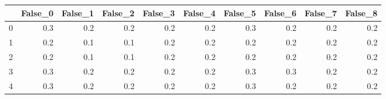 \begin{tabular}{lrrrrrrrrr}
\toprule
{} &  False\_0 &  False\_1 &  False\_2 &  False\_3 &  False\_4 &  False\_5 &  False\_6 &  False\_7 &  False\_8 \\ \hline
\midrule
0 &      0.3 &      0.2 &      0.2 &      0.2 &      0.2 &      0.3 &      0.2 &      0.2 &      0.2 \\ \hline
1 &      0.2 &      0.1 &      0.1 &      0.2 &      0.2 &      0.2 &      0.2 &      0.2 &      0.2 \\ \hline
2 &      0.2 &      0.1 &      0.1 &      0.2 &      0.2 &      0.2 &      0.2 &      0.2 &      0.2 \\ \hline
3 &      0.3 &      0.2 &      0.2 &      0.2 &      0.2 &      0.3 &      0.3 &      0.2 &      0.2 \\ \hline
4 &      0.3 &      0.2 &      0.2 &      0.2 &      0.2 &      0.3 &      0.2 &      0.2 &      0.2 \\ \hline
\bottomrule
\end{tabular}
